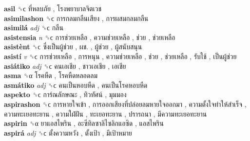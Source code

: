 \textbf{asil} ␝ϲ   ที่หลบภัย ,  โรงพยาบาลจิตเวช   \\
\textbf{asimilashon} ␝ϲ   การกลมกลืนเสียง ,  การผสมกลมกลืน   \\
\textbf{asimilá} \emph{adj}  ␝ϲ   กลืน   \\
\textbf{asistensia} \emph{n}  ␝ϲ   การช่วยเหลือ ,  ความช่วยเหลือ ,  ช่วย ,  ช่วยเหลือ   \\
\textbf{asistènt} ␝ϲ   ซึ่งเป็นผู้ช่วย ,  ผช. ,  ผู้ช่วย ,  ผู้สนับสนุน   \\
\textbf{asistí} \emph{v}  ␝ϲ   การช่วยเหลือ ,  การหนุน ,  ความช่วยเหลือ ,  ช่วย ,  ช่วยเหลือ ,  รับใช้ ,  เป็นผู้ช่วย   \\
\textbf{asiátiko} \emph{adj}  ␝ϲ   คนเอเชีย ,  ชาวเอเชีย ,  เอเชีย   \\
\textbf{asma} ␝α   โรคหืด ,  โรคหืดหลอดลม   \\
\textbf{asmátiko} \emph{adj}  ␝ϲ   คนเป็นหอบหืด ,  คนเป็นโรคหอบหืด   \\
\textbf{aspekto} ␝ϲ   การ์ณลักษณะ ,  ทิวทัศน์ ,  มุมมอง   \\
\textbf{aspirashon} ␝ϲ   การหายใจเข้า ,  การออกเสียงที่ปล่อยลมหายใจออกมา ,  ความตั้งใจทำให้สำเร็จ ,  ความทะเยอทะยาน ,  ความใฝ่ฝัน ,  ทะเยอทะยาน ,  ปรารถนา ,  มีความทะเยอทะยาน   \\
\textbf{aspirin} ␝α   ยาแอสไพริน ,  อะซีทิลซาลิไซลิกแอซิด ,  แอสไพริน   \\
\textbf{aspirá} \emph{adj}  ␝ϲ   ตั้งความหวัง ,  ตั้งเป้า ,  มีเป้าหมาย   \\
